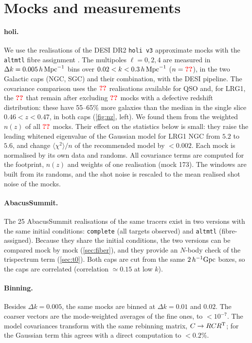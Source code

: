 \section{Mocks and measurements}
\label{sec:mocks}

\paragraph{holi.} We use the realisations of the DESI DR2 \texttt{holi v3} approximate mocks with the \texttt{altmtl} fibre assignment . The multipoles $\ell=0,2,4$ are measured in $\Delta k=0.005\,h\,\mathrm{Mpc}^{-1}$ bins over $0.02<k<0.3\,h\,\mathrm{Mpc}^{-1}$ ($n=\val{nbins}$), in the two Galactic caps (NGC, SGC) and their combination, with the DESI pipeline. The covariance comparison uses the $\val{Nmocks}$ realisations available for QSO and, for LRG1, the $\val{Nclean}$ that remain after excluding $\val{Nexcluded}$ mocks with a defective redshift distribution: these have 55--65\% more galaxies than the median in the single slice $0.46<z<0.47$, in both caps (\cref{fig:nz}, left). We found them from the weighted $n(z)$ of all $\val{nNZmocks}$ mocks. Their effect on the statistics below is small: they raise the leading whitened eigenvalue of the Gaussian model for LRG1 NGC from $5.2$ to $5.6$, and change $\langle\chi^2\rangle/n$ of the recommended model by $<0.002$. Each mock is normalised by its own data and randoms. All covariance terms are computed for the footprint, $n(z)$ and weights of one realisation (mock 173). The windows are built from its randoms, and the shot noise is rescaled to the mean realised shot noise of the mocks.

\paragraph{AbacusSummit.} The 25 AbacusSummit realisations \cite{Maksimova2021} of the same tracers exist in two versions with the same initial conditions: \texttt{complete} (all targets observed) and \texttt{altmtl} (fibre-assigned). Because they share the initial conditions, the two versions can be compared mock by mock (\cref{sec:fiber}), and they provide an $N$-body check of the trispectrum term (\cref{sec:t0}). Both caps are cut from the same $2\,h^{-1}{\rm Gpc}$ boxes, so the caps are correlated (correlation $\simeq0.15$ at low $k$).

\paragraph{Binning.} Besides $\Delta k=0.005$, the same mocks are binned at $\Delta k=0.01$ and $0.02$. The coarser vectors are the mode-weighted averages of the fine ones, to $<10^{-7}$. The model covariances transform with the same rebinning matrix, $C\to RCR^{\rm T}$; for the Gaussian term this agrees with a direct computation to $<0.2$\%.
